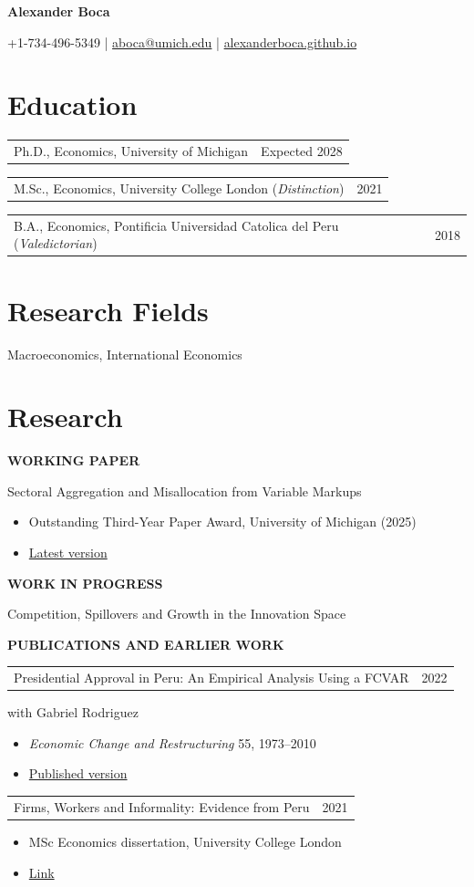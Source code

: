 \documentclass[11pt]{article}
\makeatletter
\newlength{\entryindent}
\newcommand{\nameheader}[1]{
  {\LARGE\bfseries #1}\par
}
\newcommand{\contactline}[1]{
  \vspace{0.25em}
  {\small #1}\par
}
\newcommand{\cvsubsection}[1]{
  \vspace{0.7em}
  {\small\sffamily\bfseries\MakeUppercase{#1}}\par
  \vspace{0.45em}
}
\newcommand{\datedline}[2]{
  \noindent\hspace*{\entryindent}%
  \begin{tabularx}{\dimexpr\textwidth-\entryindent\relax}{@{}Xr@{}}
    #1 & #2
  \end{tabularx}\par
}
\newcommand{\papertitle}[1]{
  \noindent\hspace*{\entryindent}%
  \parbox[t]{\dimexpr\textwidth-\entryindent\relax}{\normalsize #1}\par
}
\newcommand{\detail}[1]{
  \noindent\hspace*{\entryindent}%
  \parbox[t]{\dimexpr\textwidth-\entryindent\relax}{\small #1}\par
}
\makeatother
\begin{document}
\nameheader{Alexander Boca}
\contactline{+1-734-496-5349 \quad | \quad \href{mailto:aboca@umich.edu}{aboca@umich.edu} \quad | \quad \href{https://alexanderboca.github.io}{alexanderboca.github.io}}

\section*{Education}
\datedline{Ph.D., Economics, University of Michigan}{Expected 2028}
\datedline{M.Sc., Economics, University College London (\textit{Distinction})}{2021}
\datedline{B.A., Economics, Pontificia Universidad Catolica del Peru (\textit{Valedictorian})}{2018}

\section*{Research Fields}
Macroeconomics, International Economics

\section*{Research}

\cvsubsection{Working Paper}
\papertitle{Sectoral Aggregation and Misallocation from Variable Markups}
\begin{itemize}
  \item Outstanding Third-Year Paper Award, University of Michigan (2025)
  \item \href{https://alexanderboca.github.io/files/AB_SectoralAggregation.pdf}{Latest version}
\end{itemize}

\cvsubsection{Work in Progress}
\papertitle{Competition, Spillovers and Growth in the Innovation Space}

\cvsubsection{Publications and Earlier Work}
\datedline{Presidential Approval in Peru: An Empirical Analysis Using a FCVAR}{2022}
\detail{with Gabriel Rodriguez}
\begin{itemize}
  \item \textit{Economic Change and Restructuring} 55, 1973--2010
  \item \href{https://doi.org/10.1007/s10644-021-09374-0}{Published version}
\end{itemize}

\datedline{Firms, Workers and Informality: Evidence from Peru}{2021}
\begin{itemize}
  \item MSc Economics dissertation, University College London
  \item \href{https://renati.sunedu.gob.pe/bitstream/renati/3263/1/BocaSaraviaAA.pdf}{Link}
\end{itemize}
\end{document}
